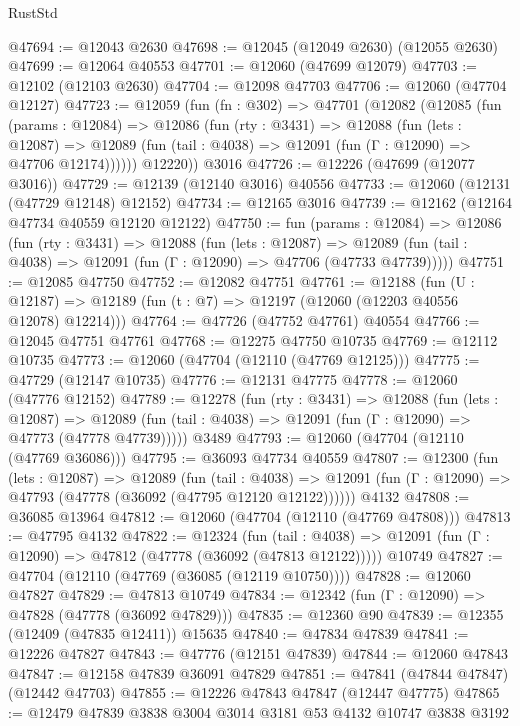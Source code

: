 \begin{lexlean}{RustStd}
\begin{coremodule}
@47694 := @12043 @2630
@47698 := @12045 (@12049 @2630) (@12055 @2630)
@47699 := @12064 @40553
@47701 := @12060 (@47699 @12079)
@47703 := @12102 (@12103 @2630)
@47704 := @12098 @47703
@47706 := @12060 (@47704 @12127)
@47723 := @12059
    (fun (fn : @302) =>
    @47701
      (@12082
        (@12085
          (fun (params : @12084) =>
          @12086
            (fun (rty : @3431) =>
            @12088
              (fun (lets : @12087) =>
              @12089 (fun (tail : @4038) => @12091 (fun (Γ : @12090) => @47706 @12174))))))
        @12220))
    @3016
@47726 := @12226 (@47699 (@12077 @3016))
@47729 := @12139 (@12140 @3016) @40556
@47733 := @12060 (@12131 (@47729 @12148) @12152)
@47734 := @12165 @3016
@47739 := @12162 (@12164 @47734 @40559 @12120 @12122)
@47750 := fun (params : @12084) =>
  @12086
    (fun (rty : @3431) =>
    @12088
      (fun (lets : @12087) =>
      @12089 (fun (tail : @4038) => @12091 (fun (Γ : @12090) => @47706 (@47733 @47739)))))
@47751 := @12085 @47750
@47752 := @12082 @47751
@47761 := @12188
    (fun (U : @12187) => @12189 (fun (t : @7) => @12197 (@12060 (@12203 @40556 @12078) @12214)))
@47764 := @47726 (@47752 @47761) @40554
@47766 := @12045 @47751 @47761
@47768 := @12275 @47750 @10735
@47769 := @12112 @10735
@47773 := @12060 (@47704 (@12110 (@47769 @12125)))
@47775 := @47729 (@12147 @10735)
@47776 := @12131 @47775
@47778 := @12060 (@47776 @12152)
@47789 := @12278
    (fun (rty : @3431) =>
    @12088
      (fun (lets : @12087) =>
      @12089 (fun (tail : @4038) => @12091 (fun (Γ : @12090) => @47773 (@47778 @47739)))))
    @3489
@47793 := @12060 (@47704 (@12110 (@47769 @36086)))
@47795 := @36093 @47734 @40559
@47807 := @12300
    (fun (lets : @12087) =>
    @12089
      (fun (tail : @4038) =>
      @12091 (fun (Γ : @12090) => @47793 (@47778 (@36092 (@47795 @12120 @12122))))))
    @4132
@47808 := @36085 @13964
@47812 := @12060 (@47704 (@12110 (@47769 @47808)))
@47813 := @47795 @4132
@47822 := @12324
    (fun (tail : @4038) => @12091 (fun (Γ : @12090) => @47812 (@47778 (@36092 (@47813 @12122)))))
    @10749
@47827 := @47704 (@12110 (@47769 (@36085 (@12119 @10750))))
@47828 := @12060 @47827
@47829 := @47813 @10749
@47834 := @12342 (fun (Γ : @12090) => @47828 (@47778 (@36092 @47829)))
@47835 := @12360 @90
@47839 := @12355 (@12409 (@47835 @12411)) @15635
@47840 := @47834 @47839
@47841 := @12226 @47827
@47843 := @47776 (@12151 @47839)
@47844 := @12060 @47843
@47847 := @12158 @47839 @36091 @47829
@47851 := @47841 (@47844 @47847) (@12442 @47703)
@47855 := @12226 @47843 @47847 (@12447 @47775)
@47865 := @12479 @47839 @3838 @3004 @3014 @3181 @53 @4132 @10747 @3838 @3192

\end{coremodule}
\end{lexlean}
